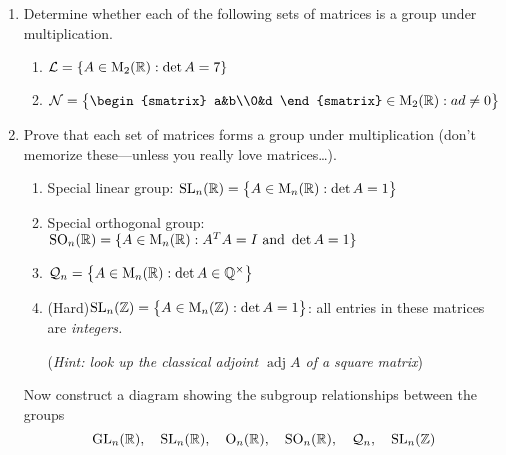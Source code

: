 \begin{exercises}
\begin{enumerate}
	  
	  \item Determine whether each of the following sets of matrices is a group under multiplication.
	  \begin{enumerate}
	    \item {} $\mathcal L=\{A\in \mathrm{M}_2(\mathbb{R}):\det A=7\}$\setcounter{enumii}{2}
	    
	    \item $\mathcal N=\bigl\{\begin{smatrix}
	    a&b\\0&d
	    \end{smatrix}\in\rM_2(\R):ad\neq 0\bigr\}$
	  \end{enumerate}
	  
	  
	  \item\label{exs:subgpmatrix} Prove that each set of matrices forms a group under multiplication (don't memorize these---unless you really love matrices\ldots).
	  \begin{enumerate}
	    \item Special linear group: $\mathrm{SL}_n(\mathbb{R})=\bigl\{A\in \mathrm{M}_n(\mathbb{R}):\det A=1\bigr\}$
	    
	    \item Special orthogonal group: $\mathrm{SO}_n(\mathbb{R})=\{A\in\mathrm{M}_n(\mathbb{R}):A^TA=I\text{ and }\det A=1\}$
	    
	    \item $\mathcal Q_n=\bigl\{A\in \mathrm{M}_n(\mathbb{R}):\det A\in\mathbb{Q}^\times\bigr\}$
	    
	    
	    \item (Hard)\lstsp $\mathrm{SL}_n(\mathbb{Z})=\bigl\{A\in \mathrm{M}_n(\mathbb{Z}):\det A=1\bigr\}$: all entries in these matrices are \emph{integers.}\par
	    (\emph{Hint: look up the classical adjoint $\operatorname{adj}A$ of a square matrix})
	  \end{enumerate}
	  Now construct a diagram showing the subgroup relationships between the groups
	  \[
	  	\mathrm{GL}_n(\mathbb{R}),\quad \mathrm{SL}_n(\mathbb{R}),\quad \mathrm{O}_n(\mathbb{R}),\quad \mathrm{SO}_n(\mathbb{R}),\quad \mathcal Q_n,\quad \mathrm{SL}_n(\mathbb{Z})
	  \]


\end{enumerate}
\end{exercises}
